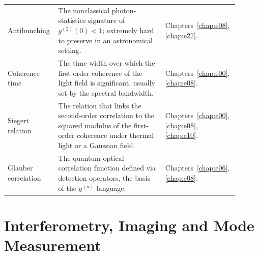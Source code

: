 \begin{longtable}{p{0.20\linewidth}p{0.45\linewidth}p{0.25\linewidth}}
Antibunching & The nonclassical photon-statistics signature of \(g^{(2)}(0)<1\); extremely hard to preserve in an astronomical setting. & Chapters~\ref{chap:e08}, \ref{chap:e27}. \\
Coherence time & The time width over which the first-order coherence of the light field is significant, usually set by the spectral bandwidth. & Chapters~\ref{chap:e00}, \ref{chap:e08}. \\
Siegert relation & The relation that links the second-order correlation to the squared modulus of the first-order coherence under thermal light or a Gaussian field. & Chapters~\ref{chap:e00}, \ref{chap:e08}, \ref{chap:e10}. \\
Glauber correlation & The quantum-optical correlation function defined via detection operators, the basis of the \(g^{(n)}\) language. & Chapters~\ref{chap:e06}, \ref{chap:e08}. \\
\bottomrule
\end{longtable}

\section{Interferometry, Imaging and Mode Measurement}
\label{appsec:c-interferometry}

